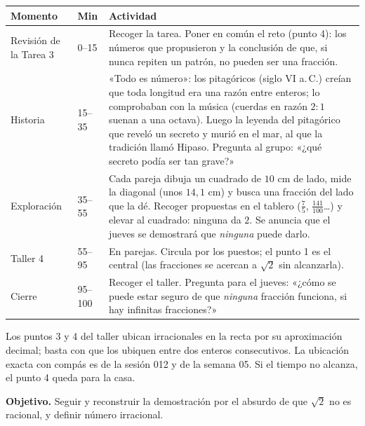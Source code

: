 \documentclass[11pt]{article}
\begin{document}
\begin{center}
{\renewcommand{\arraystretch}{1.3}
\begin{tabularx}{\linewidth}{@{}l l X@{}}
  \toprule
  \textbf{Momento} & \textbf{Min} & \textbf{Actividad}\\
  \midrule
  Revisión de la Tarea 3 & 0–15 & Recoger la tarea. Poner en común el reto (punto 4): los
    números que propusieron y la conclusión de que, si nunca repiten un patrón, no pueden ser
    una fracción.\\
  Historia & 15–35 & «Todo es número»: los pitagóricos (siglo VI a.\,C.) creían que toda
    longitud era una razón entre enteros; lo comprobaban con la música (cuerdas en razón
    $2:1$ suenan a una octava). Luego la leyenda del pitagórico que reveló un secreto y murió
    en el mar, al que la tradición llamó Hipaso. Pregunta al grupo: «¿qué secreto podía ser
    tan grave?»\\
  Exploración & 35–55 & Cada pareja dibuja un cuadrado de $10$ cm de lado, mide la diagonal
    (unos $14{,}1$ cm) y busca una fracción del lado que la dé. Recoger propuestas en el
    tablero ($\frac{7}{5}$, $\frac{141}{100}$…) y elevar al cuadrado: ninguna da $2$. Se
    anuncia que el jueves se demostrará que \emph{ninguna} puede darlo.\\
  Taller 4 & 55–95 & En parejas. Circula por los puestos; el punto 1 es el central (las
    fracciones se acercan a $\sqrt{2}$ sin alcanzarla).\\
  Cierre & 95–100 & Recoger el taller. Pregunta para el jueves: «¿cómo se puede estar seguro
    de que \emph{ninguna} fracción funciona, si hay infinitas fracciones?»\\
  \bottomrule
\end{tabularx}}
\end{center}

\begin{nota}
Los puntos 3 y 4 del taller ubican irracionales en la recta por su aproximación decimal;
basta con que los ubiquen entre dos enteros consecutivos. La ubicación exacta con compás es
de la sesión 012 y de la semana 05. Si el tiempo no alcanza, el punto 4 queda para la casa.
\end{nota}


\textbf{Objetivo.} Seguir y reconstruir la demostración por el absurdo de que $\sqrt{2}$ no es
racional, y definir número irracional.
\end{document}
